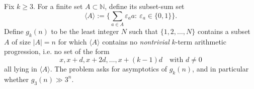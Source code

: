 Fix $k\ge 3$. For a finite set $A\subset\mathbb{N}$, define its subset-sum set
\[
\langle A\rangle := \Big\{\sum_{a\in A}\varepsilon_a a:\ \varepsilon_a\in\{0,1\}\Big\}.
\]
Define $g_k(n)$ to be the least integer $N$ such that $\{1,2,\dots,N\}$ contains a subset $A$ of size $|A|=n$ for which $\langle A\rangle$ contains no \emph{nontrivial} $k$-term arithmetic progression, i.e. no set of the form
\[
x, x+d, x+2d,\dots,x+(k-1)d\quad\text{with }d\ne0
\]
all lying in $\langle A\rangle$.
The problem asks for asymptotics of $g_k(n)$, and in particular whether $g_3(n)\gg 3^n$.
